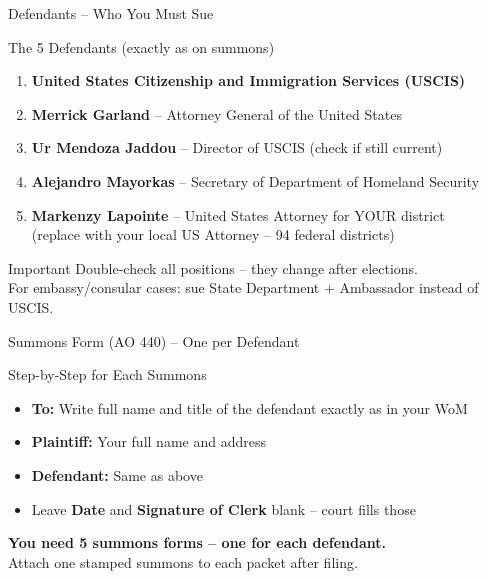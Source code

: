 \documentclass[10pt,aspectratio=169]{beamer}
\begin{document}
	\begin{frame}{Defendants – Who You Must Sue}
		\begin{block}{The 5 Defendants (exactly as on summons)}
			\begin{enumerate}
				\item \textbf{United States Citizenship and Immigration Services (USCIS)}
				\item \textbf{Merrick Garland} – Attorney General of the United States
				\item \textbf{Ur Mendoza Jaddou} – Director of USCIS \textcolor{warningred}{(check if still current)}
				\item \textbf{Alejandro Mayorkas} – Secretary of Department of Homeland Security
				\item \textbf{Markenzy Lapointe} – United States Attorney for YOUR district \\
				\tiny (replace with your local US Attorney – 94 federal districts)
			\end{enumerate}
		\end{block}
		\begin{alertblock}{ Important}
			Double-check all positions – they change after elections. \\
			For embassy/consular cases: sue State Department + Ambassador instead of USCIS.
		\end{alertblock}
	\end{frame}
	
	\begin{frame}{Summons Form (AO 440) – One per Defendant}
		\begin{block}{Step-by-Step for Each Summons}
			\begin{itemize}
				\item \textbf{To:} Write full name and title of the defendant exactly as in your WoM
				\item \textbf{Plaintiff:} Your full name and address
				\item \textbf{Defendant:} Same as above
				\item Leave \textbf{Date} and \textbf{Signature of Clerk} blank – court fills those
			\end{itemize}
		\end{block}
		\textbf{You need 5 summons forms – one for each defendant.}\\
		Attach one stamped summons to each packet after filing.
	\end{frame}
	
\end{document}
